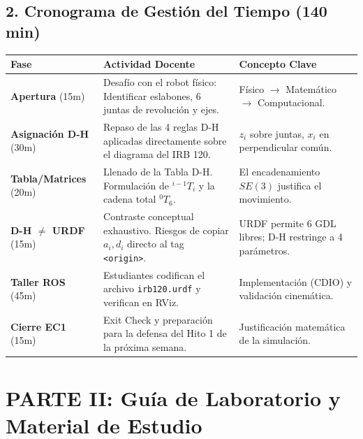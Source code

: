 \documentclass[11pt, a4paper]{article}
\begin{document}
\subsection*{2. Cronograma de Gestión del Tiempo (140 min)}
\begin{center}
    \renewcommand{\arraystretch}{1.3}
    \begin{tabularx}{\textwidth}{@{} l >{\raggedright\arraybackslash}p{4cm} X @{}}
    \toprule
    \textbf{Fase} & \textbf{Actividad Docente} & \textbf{Concepto Clave} \\ \midrule
    \textbf{Apertura} (15m) & Desafío con el robot físico: Identificar eslabones, 6 juntas de revolución y ejes. & Físico $\rightarrow$ Matemático $\rightarrow$ Computacional. \\ 
    \textbf{Asignación D-H} (30m) & Repaso de las 4 reglas D-H aplicadas directamente sobre el diagrama del IRB 120. & $z_i$ sobre juntas, $x_i$ en perpendicular común. \\ 
    \textbf{Tabla/Matrices} (20m) & Llenado de la Tabla D-H. Formulación de $^{i-1}T_i$ y la cadena total $^{0}T_6$. & El encadenamiento $SE(3)$ justifica el movimiento. \\ 
    \textbf{D-H $\neq$ URDF} (15m) & Contraste conceptual exhaustivo. Riesgos de copiar $a_i, d_i$ directo al tag \texttt{<origin>}. & URDF permite 6 GDL libres; D-H restringe a 4 parámetros. \\ 
    \textbf{Taller ROS} (45m) & Estudiantes codifican el archivo \texttt{irb120.urdf} y verifican en RViz. & Implementación (CDIO) y validación cinemática. \\ 
    \textbf{Cierre EC1} (15m) & Exit Check y preparación para la defensa del Hito 1 de la próxima semana. & Justificación matemática de la simulación. \\ \bottomrule
    \end{tabularx}
\end{center}

\newpage
\section*{PARTE II: Guía de Laboratorio y Material de Estudio}
\end{document}

